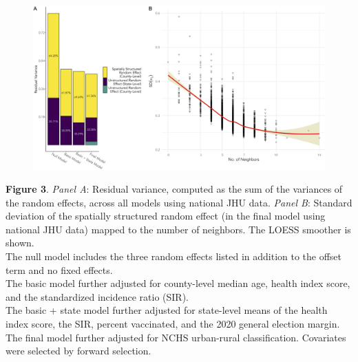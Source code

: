 \documentclass{beamer}
\begin{document}
 \begin{frame}
\vspace*{-0.1cm}
			\begin{figure}
				\centering
				\includegraphics[scale=0.076]{images-logos/combo-res-var-nbs-jhu.png}
				
			\end{figure}      
			\vspace{-0.17cm}
			\tiny{\textbf{Figure 3}. \textit{Panel A}: Residual variance, computed as the sum of the variances of the random effects, across all models using national JHU data.  \textit{Panel B}: Standard deviation of the spatially structured random effect (in the final model using national JHU data) mapped to the number of neighbors. The LOESS smoother is shown.\\
				The null model includes the three random effects listed in addition to the offset term and no fixed effects.\\
				The basic model further adjusted for county-level median age, health index score, and the standardized incidence ratio (SIR).\\
				The basic + state model further adjusted for state-level means of the health index score, the SIR, percent vaccinated, and the 2020 general election margin.\\
				The final model further adjusted for NCHS urban-rural classification. Covariates were selected by forward selection.
			}



\end{frame}
\end{document}
